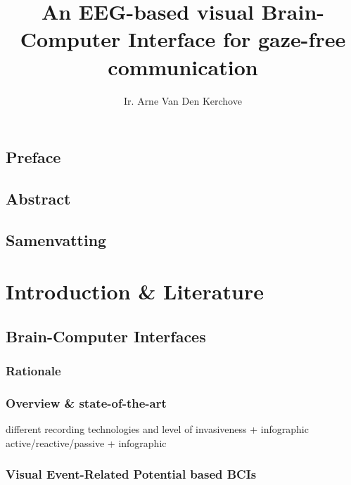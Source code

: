 %
\usepackage{todonotes}
\usepackage{lipsum}
\usepackage{tabularx}
\usepackage{makecell}
\usepackage{enumitem}
\usepackage{hyperref}

\usepackage[backend=biber]{biblatex}



\title{\sffamily An EEG-based visual Brain-Computer Interface for gaze-free communication}
\author{Ir. Arne Van Den Kerchove}




\pagestyle{front}
\frontmatter

\chapter{Preface}
\lipsum[1]
\chapter{Abstract}
\lipsum[2-4]
\chapter{Samenvatting}
\lipsum[5-7]
\tableofcontents
\listoffigures
\listoftables



\mainmatter
\pagestyle{main}


\part{Introduction \& Literature}

\chapter{Brain-Computer Interfaces}
\begin{refsection}
	\section{Rationale}
	\section{Overview \& state-of-the-art}
	different recording technologies and level of invasiveness + infographic
	active/reactive/passive + infographic
	\section{Visual Event-Related Potential based BCIs}
	\printbibliography[heading=subbibliography]
\end{refsection}

